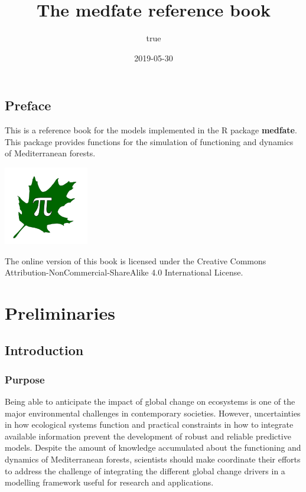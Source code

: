 \documentclass[]{book}
\title{The medfate reference book}
\author{true}
\date{2019-05-30}
\begin{document}
\maketitle

{
\setcounter{tocdepth}{1}
\tableofcontents
}
\chapter*{Preface}\label{preface}

This is a reference book for the models implemented in the R package
\textbf{medfate}. This package provides functions for the simulation of
functioning and dynamics of Mediterranean forests.

\begin{center}\includegraphics[width=0.2\linewidth]{LOGO_Group} \end{center}

The online version of this book is licensed under the Creative Commons
Attribution-NonCommercial-ShareAlike 4.0 International License.

\part{Preliminaries}\label{part-preliminaries}

\chapter{Introduction}\label{intro}

\section{Purpose}\label{purpose}

Being able to anticipate the impact of global change on ecosystems is
one of the major environmental challenges in contemporary societies.
However, uncertainties in how ecological systems function and practical
constraints in how to integrate available information prevent the
development of robust and reliable predictive models. Despite the amount
of knowledge accumulated about the functioning and dynamics of
Mediterranean forests, scientists should make coordinate their efforts
to address the challenge of integrating the different global change
drivers in a modelling framework useful for research and applications.
\end{document}
